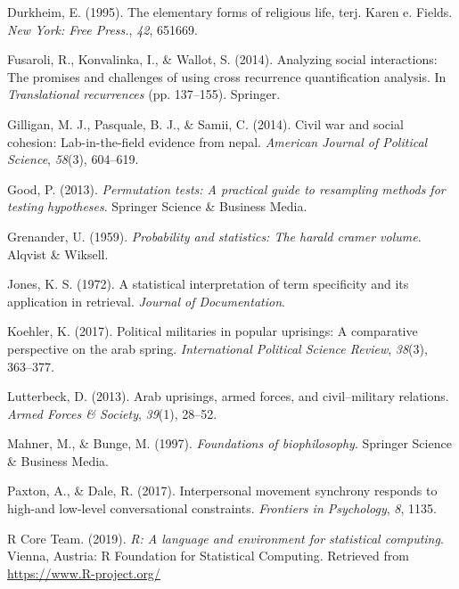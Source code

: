 \documentclass[english,man]{apa6}
\begin{document}
\leavevmode\hypertarget{ref-durkheim1995elementary}{}%
Durkheim, E. (1995). The elementary forms of religious life, terj. Karen e. Fields. \emph{New York: Free Press.}, \emph{42}, 651669.

\leavevmode\hypertarget{ref-fusaroli2014analyzing}{}%
Fusaroli, R., Konvalinka, I., \& Wallot, S. (2014). Analyzing social interactions: The promises and challenges of using cross recurrence quantification analysis. In \emph{Translational recurrences} (pp. 137--155). Springer.

\leavevmode\hypertarget{ref-gilligan2014civil}{}%
Gilligan, M. J., Pasquale, B. J., \& Samii, C. (2014). Civil war and social cohesion: Lab-in-the-field evidence from nepal. \emph{American Journal of Political Science}, \emph{58}(3), 604--619.

\leavevmode\hypertarget{ref-good2013permutation}{}%
Good, P. (2013). \emph{Permutation tests: A practical guide to resampling methods for testing hypotheses}. Springer Science \& Business Media.

\leavevmode\hypertarget{ref-grenander1959probability}{}%
Grenander, U. (1959). \emph{Probability and statistics: The harald cramer volume}. Alqvist \& Wiksell.

\leavevmode\hypertarget{ref-jones1972statistical}{}%
Jones, K. S. (1972). A statistical interpretation of term specificity and its application in retrieval. \emph{Journal of Documentation}.

\leavevmode\hypertarget{ref-koehler2017political}{}%
Koehler, K. (2017). Political militaries in popular uprisings: A comparative perspective on the arab spring. \emph{International Political Science Review}, \emph{38}(3), 363--377.

\leavevmode\hypertarget{ref-lutterbeck2013arab}{}%
Lutterbeck, D. (2013). Arab uprisings, armed forces, and civil--military relations. \emph{Armed Forces \& Society}, \emph{39}(1), 28--52.

\leavevmode\hypertarget{ref-mahner1997foundations}{}%
Mahner, M., \& Bunge, M. (1997). \emph{Foundations of biophilosophy}. Springer Science \& Business Media.

\leavevmode\hypertarget{ref-paxton2017interpersonal}{}%
Paxton, A., \& Dale, R. (2017). Interpersonal movement synchrony responds to high-and low-level conversational constraints. \emph{Frontiers in Psychology}, \emph{8}, 1135.

\leavevmode\hypertarget{ref-R-base}{}%
R Core Team. (2019). \emph{R: A language and environment for statistical computing}. Vienna, Austria: R Foundation for Statistical Computing. Retrieved from \url{https://www.R-project.org/}
\end{document}

